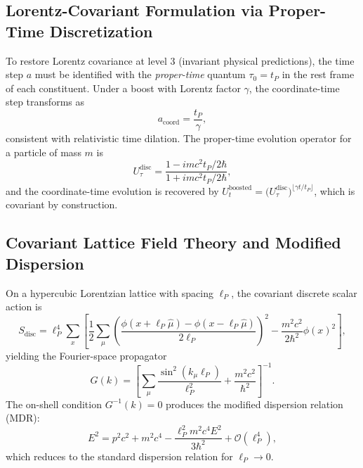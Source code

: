 \documentclass[11pt,a4paper]{article}
\begin{document}
\subsection{Lorentz-Covariant Formulation via Proper-Time Discretization}

To restore Lorentz covariance at level 3 (invariant physical predictions), the time step $a$ must be identified with the \emph{proper-time} quantum $\tau_0 = t_P$ in the rest frame of each constituent. Under a boost with Lorentz factor $\gamma$, the coordinate-time step transforms as
\begin{equation}
  a_{\mathrm{coord}} = \frac{t_P}{\gamma},
  \label{eq:6}
\end{equation}
consistent with relativistic time dilation. The proper-time evolution operator for a particle of mass $m$ is
\begin{equation}
  U_\tau^{\mathrm{disc}} = \frac{1 - imc^2 t_P/2\hbar}{1 + imc^2 t_P/2\hbar},
  \label{eq:7}
\end{equation}
and the coordinate-time evolution is recovered by $U_t^{\mathrm{boosted}} = \bigl(U_\tau^{\mathrm{disc}}\bigr)^{\lfloor \gamma t/t_P \rfloor}$, which is covariant by construction.

\subsection{Covariant Lattice Field Theory and Modified Dispersion}

On a hypercubic Lorentzian lattice with spacing $\ell_P$, the covariant discrete scalar action is
\begin{equation}
  S_{\mathrm{disc}} = \ell_P^4\sum_x\left[\frac{1}{2}\sum_\mu\!\left(\frac{\phi(x+\ell_P\hat{\mu})-\phi(x-\ell_P\hat{\mu})}{2\ell_P}\right)^{\!2} - \frac{m^2c^2}{2\hbar^2}\phi(x)^2\right],
  \label{eq:8}
\end{equation}
yielding the Fourier-space propagator
\begin{equation}
  G(k) = \left[\sum_\mu \frac{\sin^2(k_\mu\ell_P)}{\ell_P^2} + \frac{m^2c^2}{\hbar^2}\right]^{-1}.
  \label{eq:9}
\end{equation}
The on-shell condition $G^{-1}(k)=0$ produces the modified dispersion relation (MDR):
\begin{equation}
  E^2 = p^2c^2 + m^2c^4 - \frac{\ell_P^2 m^2c^4 E^2}{3\hbar^2} + \mathcal{O}(\ell_P^4),
  \label{eq:10}
\end{equation}
which reduces to the standard dispersion relation for $\ell_P\to 0$.
\end{document}

